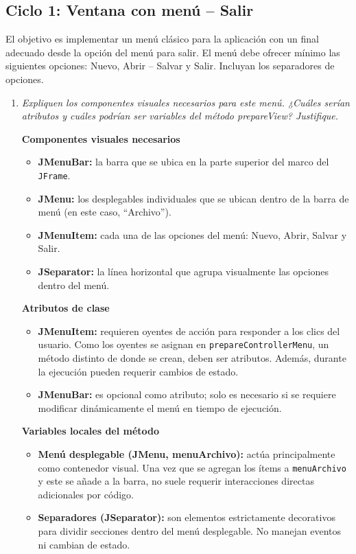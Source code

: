 \documentclass[12pt,letterpaper]{article}
\newcommand{\enunciado}[1]{\textit{#1}\par}
\begin{document}
\subsection{Ciclo 1: Ventana con menú -- Salir}

El objetivo es implementar un menú clásico para la aplicación con un final adecuado desde la opción del menú para salir. El menú debe ofrecer mínimo las siguientes opciones: Nuevo, Abrir -- Salvar y Salir. Incluyan los separadores de opciones.

\begin{enumerate}
  \item \enunciado{Expliquen los componentes visuales necesarios para este menú. ¿Cuáles serían atributos y cuáles podrían ser variables del método prepareView? Justifique.}

  \textbf{Componentes visuales necesarios}
  \begin{itemize}
    \item \textbf{JMenuBar:} la barra que se ubica en la parte superior del marco del \texttt{JFrame}.
    \item \textbf{JMenu:} los desplegables individuales que se ubican dentro de la barra de menú (en este caso, ``Archivo'').
    \item \textbf{JMenuItem:} cada una de las opciones del menú: Nuevo, Abrir, Salvar y Salir.
    \item \textbf{JSeparator:} la línea horizontal que agrupa visualmente las opciones dentro del menú.
  \end{itemize}

  \textbf{Atributos de clase}
  \begin{itemize}
    \item \textbf{JMenuItem:} requieren oyentes de acción para responder a los clics del usuario. Como los oyentes se asignan en \texttt{prepareControllerMenu}, un método distinto de donde se crean, deben ser atributos. Además, durante la ejecución pueden requerir cambios de estado.
    \item \textbf{JMenuBar:} es opcional como atributo; solo es necesario si se requiere modificar dinámicamente el menú en tiempo de ejecución.
  \end{itemize}

  \textbf{Variables locales del método}
  \begin{itemize}
    \item \textbf{Menú desplegable (JMenu, menuArchivo):} actúa principalmente como contenedor visual. Una vez que se agregan los ítems a \texttt{menuArchivo} y este se añade a la barra, no suele requerir interacciones directas adicionales por código.
    \item \textbf{Separadores (JSeparator):} son elementos estrictamente decorativos para dividir secciones dentro del menú desplegable. No manejan eventos ni cambian de estado.
  \end{itemize}


\end{enumerate}
\end{document}
